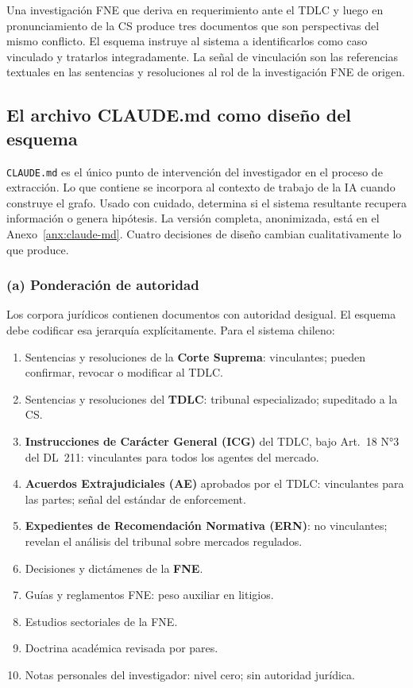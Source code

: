 \documentclass[12pt,a4paper]{article}
\begin{document}
\begin{infobox}
Una investigación FNE que deriva en requerimiento ante el TDLC y luego en
pronunciamiento de la CS produce tres documentos que son perspectivas del mismo
conflicto. El esquema instruye al sistema a identificarlos como caso vinculado y
tratarlos integradamente. La señal de vinculación son las referencias textuales
en las sentencias y resoluciones al rol de la investigación FNE de origen.
\end{infobox}

\subsection{El archivo CLAUDE.md como diseño del esquema}

\texttt{CLAUDE.md} es el único punto de intervención del investigador en el
proceso de extracción. Lo que contiene se incorpora al contexto de trabajo de la
IA cuando construye el grafo. Usado con cuidado, determina si el sistema
resultante recupera información o genera hipótesis.\autocite{schrepel2026brain}
La versión completa, anonimizada, está en el Anexo~\ref{anx:claude-md}. Cuatro
decisiones de diseño cambian cualitativamente lo que produce.

\subsubsection*{(a) Ponderación de autoridad}

Los corpora jurídicos contienen documentos con autoridad desigual. El esquema
debe codificar esa jerarquía explícitamente. Para el sistema chileno:

\begin{enumerate}[label=\arabic*.]
  \item Sentencias y resoluciones de la \textbf{Corte Suprema}: vinculantes;
    pueden confirmar, revocar o modificar al TDLC.
  \item Sentencias y resoluciones del \textbf{TDLC}: tribunal especializado;
    supeditado a la CS.
  \item[\phantom{0}2b.] \textbf{Instrucciones de Carácter General (ICG)} del
    TDLC, bajo Art.~18 N°3 del DL~211: vinculantes para todos los agentes del
    mercado.
  \item[\phantom{0}2c.] \textbf{Acuerdos Extrajudiciales (AE)} aprobados por el
    TDLC: vinculantes para las partes; señal del estándar de enforcement.
  \item[\phantom{0}2d.] \textbf{Expedientes de Recomendación Normativa (ERN)}:
    no vinculantes; revelan el análisis del tribunal sobre mercados regulados.
  \item Decisiones y dictámenes de la \textbf{FNE}.
  \item Guías y reglamentos FNE: peso auxiliar en litigios.
  \item Estudios sectoriales de la FNE.
  \item Doctrina académica revisada por pares.
  \item[0.] Notas personales del investigador: nivel cero; sin autoridad jurídica.
\end{enumerate}
\end{document}
